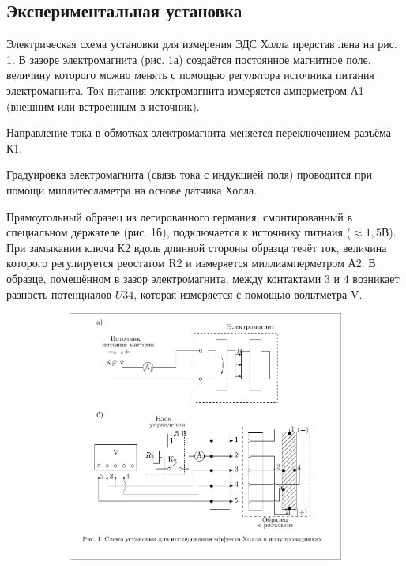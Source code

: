 \documentclass[a4paper, 12pt]{article}
\begin{document}
\bigskip

\subsection*{Экспериментальная установка}

Электрическая схема установки для измерения ЭДС Холла представ­
лена на рис. 1. В зазоре электромагнита (рис. 1а) создаётся постоянное
магнитное поле, величину которого можно менять с помощью регуля­тора источника
питания электромагнита. Ток питания электромагни­та измеряется амперметром А1
(внешним или встроенным в источник).

Направление тока в обмотках электромагнита меняется переключением
разъёма К1.

Градуировка электромагнита (связь тока с индукцией поля) проводится при
помощи миллитесламетра на основе датчика Хол­ла.

Прямоугольный образец из легированного германия, смонтированный в специальном
держателе (рис. 1б), подключается к источнику питнаия ($\approx 1,5 \text{В}$).
При замыкании ключа К2 вдоль длинной стороны образца течёт ток, величина
которого регулируется реостатом R2 и измеряется миллиамперметром А2. В образце,
помещённом в зазор электромагнита, между контактами 3 и 4 возникает разность
потенциалов $U34$, которая измеряется с помощью вольтметра V.

\begin{figure}[H]
    \centering
    \begin{subfigure}{0.8\textwidth}
        \centering
        \includegraphics[width=1\textwidth]{img/Setup.png}
    \end{subfigure}
\end{figure}
\end{document}
